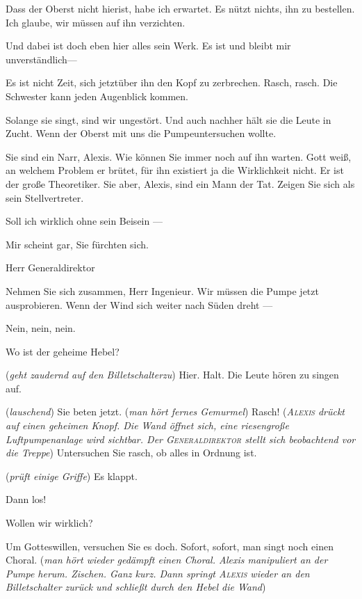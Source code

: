 \documentclass[
	final,
	a4paper,
	ngerman,
	mpinclude = true, %
	twoside = true,
	open = right,
	cleardoublepage = plain,
	DIV = 13,
	BCOR = 1cm,
	titlepage = firstiscover,
	]{scrbook}
\newcommand{\direction}[1]{(\textit{#1})}
\newcommand{\thecharacter}[1]{\textup{\textsc{#1}}\xspace}
\newcommand{\theGeneraldirektor}{\thecharacter{Generaldirektor}}
\newcommand{\theAlexis}{\thecharacter{Alexis}}
\newcommand{\character}[1]{\item[#1]}
\newcommand{\Generaldirektor}{\character{Direktor}}
\newcommand{\Alexis}{\character{\theAlexis}}
\begin{document}
\begin{play}
\Generaldirektor
Dass der Oberst nicht hierist, habe ich erwartet. Es nützt nichts, ihn zu bestellen. Ich glaube, wir müssen auf ihn verzichten.

\Alexis
Und dabei ist doch eben hier alles sein Werk. Es ist und bleibt mir unverständlich---

\Generaldirektor
Es ist nicht Zeit, sich jetztüber ihn den Kopf zu zerbrechen. Rasch, rasch. Die Schwester kann jeden Augenblick kommen.

\Alexis
Solange sie singt, sind wir ungestört. Und auch nachher hält sie die Leute in Zucht. Wenn der Oberst mit uns die Pumpeuntersuchen wollte.

\Generaldirektor
Sie sind ein Narr, Alexis. Wie können Sie immer noch auf ihn warten. Gott weiß, an welchem Problem er brütet, für ihn existiert ja die Wirklichkeit nicht. Er ist der große Theoretiker. Sie aber, Alexis, sind ein Mann der Tat. Zeigen Sie sich als sein Stellvertreter.

\Alexis
Soll ich wirklich ohne sein Beisein ---

\Generaldirektor
Mir scheint gar, Sie fürchten sich.

\Alexis
Herr Generaldirektor

\Generaldirektor
Nehmen Sie sich zusammen, Herr Ingenieur. Wir müssen die Pumpe jetzt ausprobieren. Wenn der Wind sich weiter nach Süden dreht ---

\Alexis
Nein, nein, nein.

\Generaldirektor
Wo ist der geheime Hebel?

\Alexis
\direction{geht zaudernd auf den Billetschalterzu} Hier. Halt. Die Leute hören zu singen auf.

\Generaldirektor
\direction{lauschend} Sie beten jetzt. \direction{man hört fernes Gemurmel} Rasch! \direction{\theAlexis drückt auf einen geheimen Knopf. Die Wand öffnet sich, eine riesengroße Luftpumpenanlage wird sichtbar. Der \theGeneraldirektor stellt sich beobachtend vor die Treppe} Untersuchen Sie rasch, ob alles in Ordnung ist.

\Alexis
\direction{prüft einige Griffe} Es klappt.

\Generaldirektor
Dann los!

\Alexis
Wollen wir wirklich?

\Generaldirektor
Um Gotteswillen, versuchen Sie es doch. Sofort, sofort, man singt noch einen Choral. \direction{man hört wieder gedämpft einen Choral. Alexis manipuliert an der Pumpe herum. Zischen. Ganz kurz. Dann springt \theAlexis wieder an den Billetschalter zurück und schließt durch den Hebel die Wand}


\end{play}
\end{document}
